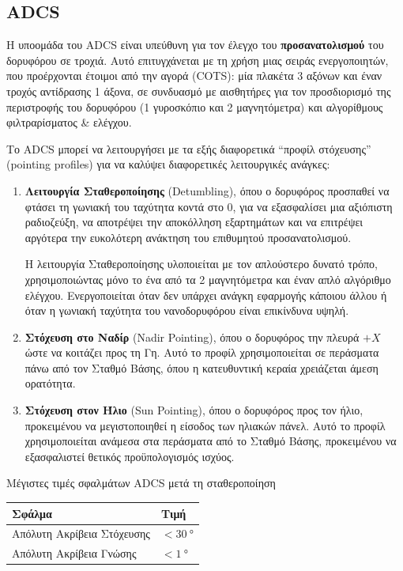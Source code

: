 \documentclass[a4paper,nobib]{tufte-book}
\begin{document}
\subsection{\acf{ADCS}}
\label{sec:adcs}

Η υποομάδα του \ac{ADCS} είναι υπεύθυνη για τον έλεγχο του \textbf{προσανατολισμού} του δορυφόρου σε τροχιά. Αυτό επιτυγχάνεται με τη χρήση μιας σειράς ενεργοποιητών, που προέρχονται έτοιμοι από την αγορά (\ac{COTS}): μία πλακέτα 3 αξόνων και έναν τροχός αντίδρασης 1 άξονα, σε συνδυασμό με αισθητήρες για τον προσδιορισμό της περιστροφής του δορυφόρου (1 γυροσκόπιο και 2 μαγνητόμετρα) και αλγορίθμους φιλτραρίσματος \& ελέγχου. \autocite{DDJF_AOCS,velentzas_design_attitude_2021}

Το \ac{ADCS} μπορεί να λειτουργήσει με τα εξής διαφορετικά ``προφίλ στόχευσης'' (pointing profiles) για να καλύψει διαφορετικές λειτουργικές ανάγκες:
\begin{enumerate}
	\item \textbf{Λειτουργία Σταθεροποίησης} (Detumbling), όπου ο δορυφόρος προσπαθεί να φτάσει τη γωνιακή του ταχύτητα κοντά στο 0, για να εξασφαλίσει μια αξιόπιστη ραδιοζεύξη, να αποτρέψει την αποκόλληση εξαρτημάτων και να επιτρέψει αργότερα την ευκολότερη ανάκτηση του επιθυμητού προσανατολισμού.
	
	Η λειτουργία Σταθεροποίησης υλοποιείται με τον απλούστερο δυνατό τρόπο, χρησιμοποιώντας μόνο το ένα από τα 2 μαγνητόμετρα και έναν απλό αλγόριθμο ελέγχου. Ενεργοποιείται όταν δεν υπάρχει ανάγκη εφαρμογής κάποιου άλλου ή όταν η γωνιακή ταχύτητα του νανοδορυφόρου είναι επικίνδυνα υψηλή.
	
	\item \textbf{Στόχευση στο Ναδίρ} (Nadir Pointing), όπου ο δορυφόρος  την πλευρά \(+X\) ώστε να κοιτάζει προς τη Γη. Αυτό το προφίλ χρησιμοποιείται σε περάσματα πάνω από τον Σταθμό Βάσης, όπου η κατευθυντική κεραία χρειάζεται άμεση ορατότητα.
	
	\item \textbf{Στόχευση στον Ήλιο} (Sun Pointing), όπου ο δορυφόρος  προς τον ήλιο, προ\-κει\-μέ\-νου να μεγιστοποιηθεί η είσοδος των ηλιακών πάνελ. Αυτό το προφίλ χρησιμοποιείται ανάμεσα στα περάσματα από το Σταθμό Βάσης, προκειμένου να εξασφαλιστεί θετικός προϋπολογισμός ισχύος.
\end{enumerate}

\begin{margintable}
	\centering
	\caption[Μέγιστες τιμές σφαλμάτων ADCS μετά τη σταθεροποίηση]{Μέγιστες τιμές σφαλμάτων \ac{ADCS} μετά τη σταθεροποίηση}
	\label{tab:adcsape}
	\begin{tabular}{@{}ll@{}}
		\toprule
		Σφάλμα                      & Τιμή                    \\ \midrule
		Απόλυτη Ακρίβεια Στόχευσης & \( < \SI{30}{\degree} \) \\
		Απόλυτη Ακρίβεια Γνώσης    & \( < \SI{1}{\degree} \) 
	\end{tabular}
\end{margintable}
\end{document}
